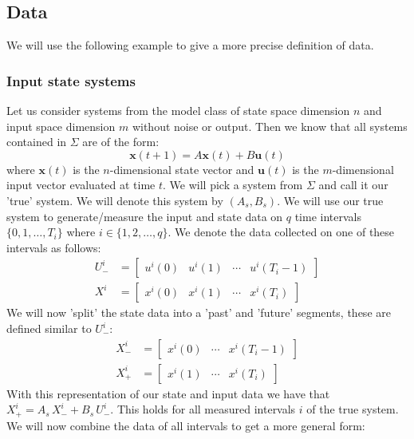 \subsection{Data}
We will use the following example \cite[Ex 2]{waarde2019data} to give a more precise definition of data.

\subsubsection*{Input state systems}
Let us consider systems from the model class of state space dimension $n$ and input space dimension $m$ without noise or output. Then we know that all systems contained in $\Sigma$ are of the form:
\begin{equation}
	\label{isSystem}
	\mathbf{x}(t+1) = A \mathbf{x}(t) + B \mathbf{u}(t)
\end{equation}
where $\mathbf{x}(t)$ is the $n$-dimensional state vector and $\mathbf{u}(t)$ is the $m$-dimensional input vector evaluated at time $t$. We will pick a system from $\Sigma$ and call it our 'true' system. We will denote this system by $(A_s , B_s)$. 
We will use our true system to generate/measure the input and state data on $q$ time intervals $\{0,1,\dots,T_i\}$ where $i \in \{1,2,\dots,q\}$. We denote the data collected on one of these intervals as follows:
\begin{align*}
	U^{i}_{-} &= \left[ \begin{array}{cccc} u^{i}(0) & u^{i}(1) & \cdots & u^{i}(T_i - 1) \end{array} \right] \\
	X^{i}     &= \left[ \begin{array}{cccc} x^{i}(0) & x^{i}(1) & \cdots & x^{i}(T_i) \end{array} \right]
\end{align*}
We will now 'split' the state data into a 'past' and 'future' segments, these are defined similar to $U^i_-$:
\begin{align*}
	X^{i}_{-} &= \left[ \begin{array}{ccc} x^{i}(0) & \cdots & x^{i}(T_i - 1) \end{array} \right] \\
	X^{i}_{+} &= \left[ \begin{array}{ccc} x^{i}(1) & \cdots & x^{i}(T_i) \end{array} \right]
\end{align*}
With this representation of our state and input data we have that $X^{i}_{+} = A_s \, X^{i}_{-} + B_s \, U^{i}_{-}$. This holds for all measured intervals $i$ of the true system. We will now combine the data of all intervals to get a more general form:
